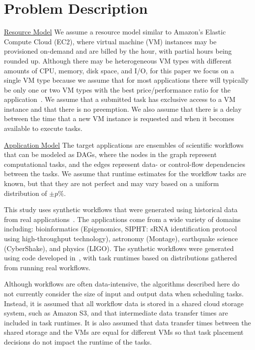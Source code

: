 \documentclass[conference]{IEEEtran}
\begin{document}
 
\section{Problem Description}
\label{sec:problem}

\underline{Resource Model}  We assume a resource model similar to Amazon's Elastic Compute Cloud (EC2),
where virtual machine (VM) instances may be provisioned on-demand and are billed by
the hour, with partial hours being rounded up. Although there may be
heterogeneous VM types with different amounts of CPU, memory, disk space, and
I/O, for this paper we focus on a single VM type because we assume that for most
applications there will typically be only one or two VM types with the best
price/performance ratio for the application~\cite{Juve2009}. We assume that
a submitted task has exclusive access to a VM instance and that there is no
preemption. We also assume that there is a delay between the time that a new VM
instance is requested and when it becomes available to execute tasks.

\underline{Application Model} The target applications are ensembles of
scientific workflows that can be modeled as DAGs, where the nodes in the graph
represent computational tasks, and the edges represent data- or control-flow
dependencies between the tasks. We assume that runtime estimates for the
workflow tasks are known, but that they are not perfect and may vary based on
a uniform distribution of $\pm p\%$.

This study uses synthetic workflows that were generated using historical data
from real applications~\cite{Bharathi2008}. The applications come from a wide
variety of domains including: bioinformatics (Epigenomics, SIPHT: sRNA
identification protocol using high-throughput technology), astronomy
(Montage), earthquake science (CyberShake), and physics (LIGO). The synthetic
workflows were generated using code developed in~\cite{WorkflowGenerator},
with task runtimes based on distributions gathered from running real
workflows.

Although workflows are often data-intensive, the algorithms described
here do not currently consider the size of input and output data
when scheduling tasks. Instead, it is assumed that all workflow data is stored in
a shared cloud storage system, such as Amazon S3, and that intermediate data
transfer times are included in task runtimes. It is also assumed that
data transfer times between the shared storage and the VMs are equal for
different VMs so that task placement decisions do not impact the
runtime of the tasks.
\end{document}

